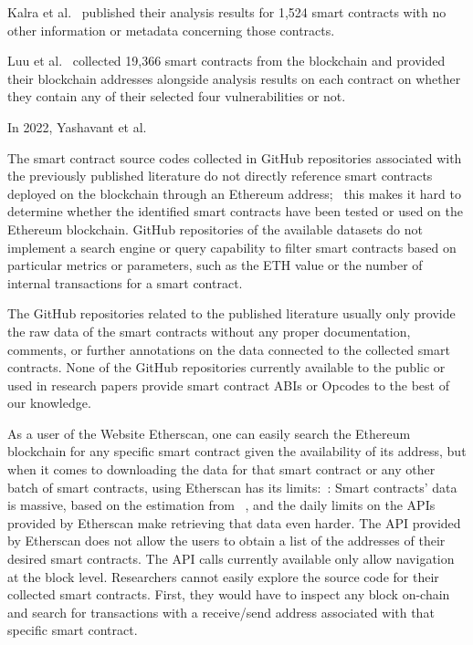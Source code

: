     Kalra et al.~\cite{kalra2018zeus} published their analysis results for 1,524 smart contracts with no other information or metadata concerning those contracts.

    Luu et al.~\cite{oyente} collected 19,366 smart contracts from the blockchain and provided their blockchain addresses alongside analysis results on each contract on whether they contain any of their selected four vulnerabilities or not.

    In 2022, Yashavant et al. ~\cite{yashavant2022scrawld}

    The smart contract source codes collected in GitHub repositories associated with the previously published literature do not directly reference smart contracts deployed on the blockchain through an Ethereum address;~\cite{pierro2020organized}
    this makes it hard to determine whether the identified smart contracts have been tested or used on the Ethereum blockchain.
    GitHub repositories of the available datasets do not implement a search engine or query capability to filter smart contracts based on particular metrics or parameters,
	such as the ETH value or the number of internal transactions for a smart contract.
    
    The GitHub repositories related to the published literature usually only provide the raw data of the smart contracts without any proper documentation,
	comments, or further annotations on the data connected to the collected smart contracts.
    None of the GitHub repositories currently available to the public or used in research papers provide smart contract ABIs or Opcodes to the best of our knowledge.
    
    As a user of the Website Etherscan, one can easily search the Ethereum blockchain for any specific smart contract given the availability of its address, but when it comes to downloading the data for that smart contract or any other batch of smart contracts,  using Etherscan has its limits:~\cite{pierro2020organized}:
    Smart contracts' data is massive, based on the estimation from ~\cite{pierro2020organized}, and the daily limits on the APIs provided by Etherscan make retrieving that data even harder.
    The API provided by Etherscan does not allow the users to obtain a list of the addresses of their desired smart contracts.
    The  API calls currently available only allow navigation at the block level.
    Researchers cannot easily explore the source code for their collected smart contracts.
    First, they would have to inspect any block on-chain and search for transactions with a receive/send address associated with that specific smart contract.

